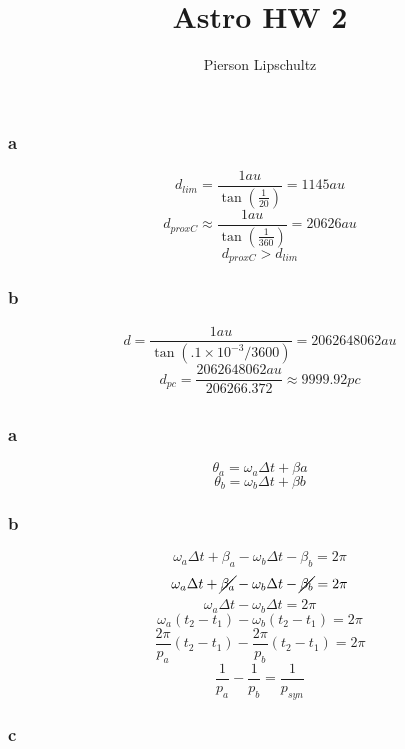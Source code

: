 \documentclass{article}
\title{Astro HW 2}
\author{Pierson Lipschultz}
\begin{document}
\maketitle
\setcounter{section}{1}
\section{}
\subsection{}
\subsubsection{a}

\[d_{lim} = \frac{1au}{\tan(\frac{1}{20})} = 1145au \]
\[ d_{proxC} \approx \frac{1au}{\tan(\frac{1}{360})} = 20626au \]
\[d_{proxC} > d_{lim}\]

\subsubsection{b}

\[d = \frac{1au}{\tan(.1 \times 10^{-3}/3600)} = 2062648062au\]
\[d_{pc} = \frac{2062648062au}{206266.372} \approx 9999.92pc \]

\subsection{}

\subsubsection{a}
\[\theta_a = \omega_{a} \Delta t + \beta a  \]
\[\theta_b = \omega_{b} \Delta t + \beta b  \]
\subsubsection{b}

\[ \omega_a\Delta t + \beta_a - \omega_b\Delta t - \beta_b = 2\pi\]
\[ \omega_a\Delta t + \cancel{\beta_a} - \omega_b\Delta t - \cancel{\beta_b} = 2\pi\]
\[ \omega_a\Delta t  - \omega_b\Delta t = 2\pi\]
\[ \omega_a(t_2-t_1)  - \omega_b(t_2-t_1) = 2\pi\]
\[ \frac{2\pi}{p_a}(t_2-t_1)  - \frac{2\pi}{p_b}(t_2-t_1) = 2\pi\]
\[ \frac{1}{p_a}  - \frac{1}{p_b} = \frac{1}{p_{syn}}\]


\subsubsection{c}
\end{document}
